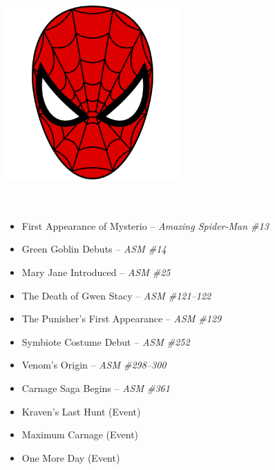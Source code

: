 \documentclass[12pt]{article}
\begin{document}
\hypertarget{spiderman}{}

\begin{center}
    \includegraphics[width=0.5\textwidth]{spiderman.png} \\[1cm]
    {\Huge\bfseries\textcolor{white}{Spider-Man Reading Order}}\\[0.5cm]
    {\large\textcolor{white}{Key Moments, Events, and Highlights}}\\[1.5cm]
\end{center}

\vspace{0.5cm}
\begin{tcolorbox}[
  colback=white!0,  %
  colframe=black,
  width=\textwidth,
  boxrule=1pt,
  arc=6pt,
  left=10pt, right=10pt, top=10pt, bottom=10pt
]
\begin{itemize}
    \item First Appearance of Mysterio – \textit{Amazing Spider-Man \#13}
    \item Green Goblin Debuts – \textit{ASM \#14}
    \item Mary Jane Introduced – \textit{ASM \#25}
    \item The Death of Gwen Stacy – \textit{ASM \#121–122}
    \item The Punisher’s First Appearance – \textit{ASM \#129}
    \item Symbiote Costume Debut – \textit{ASM \#252}
    \item Venom’s Origin – \textit{ASM \#298–300}
    \item Carnage Saga Begins – \textit{ASM \#361}
    \item Kraven's Last Hunt (Event)
    \item Maximum Carnage (Event)
    \item One More Day (Event)
\end{itemize}
\end{tcolorbox}
\end{document}
